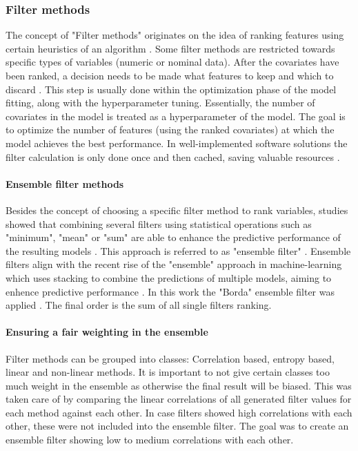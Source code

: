 \documentclass[review]{elsarticle}
\begin{document}
\subsubsection{Filter methods}

\noindent The concept of "Filter methods" originates on the idea of ranking features using certain heuristics of an algorithm \citep{chandrashekar2014}.
Some filter methods are restricted towards specific types of variables (numeric or nominal data).
After the covariates have been ranked, a decision needs to be made what features to keep and which to discard \citep{drotar2015}.
This step is usually done within the optimization phase of the model fitting, along with the hyperparameter tuning.
Essentially, the number of covariates in the model is treated as a hyperparameter of the model.
The goal is to optimize the number of features (using the ranked covariates) at which the model achieves the best performance.
In well-implemented software solutions the filter calculation is only done once and then cached, saving valuable resources \citep{mlr}.

\paragraph{Ensemble filter methods}

Besides the concept of choosing a specific filter method to rank variables, studies showed that combining several filters using statistical operations such as "minimum", "mean" or "sum" are able to enhance the predictive performance of the resulting models \citep{abeel2010, drotar2017a}.
This approach is referred to as "ensemble filter" \citep{dietterich2000}.
Ensemble filters align with the recent rise of the "ensemble" approach in machine-learning which uses stacking to combine the predictions of multiple models, aiming to enhence predictive performance \citep{polikar2012, feurer2015}.
In this work the "Borda" ensemble filter was applied \citep{drotar2017a}.
The final order is the sum of all single filters ranking.

\paragraph{Ensuring a fair weighting in the ensemble}
Filter methods can be grouped into classes: Correlation based, entropy based, linear and non-linear methods.
It is important to not give certain classes too much weight in the ensemble as otherwise the final result will be biased.
This was taken care of by comparing the linear correlations of all generated filter values for each method against each other.
In case filters showed high correlations with each other, these were not included into the ensemble filter.
The goal was to create an ensemble filter showing low to medium correlations with each other.
\end{document}
